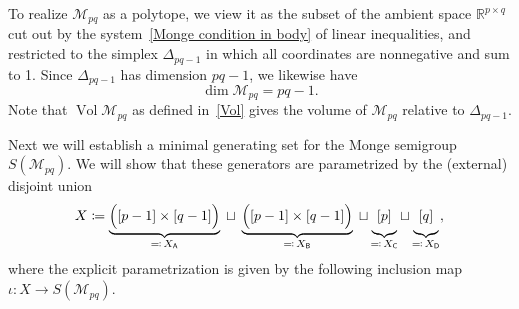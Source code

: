 \documentclass[noamsfonts,10pt]{amsart}
\newcommand{\R}{\mathbb{R}}
\newcommand{\M}{\mathcal{M}}
\DeclareMathOperator{\Vol}{Vol}
\newcommand{\sA}{\mathsf{A}}
\newcommand{\sB}{\mathsf{B}}
\newcommand{\sC}{\mathsf{C}}
\newcommand{\sD}{\mathsf{D}}
\newcommand{\1}{\mathbf{1}}
\theoremstyle{plain}
\theoremstyle{definition}
\numberwithin{equation}{section}
\begin{document}
To realize $\M_{pq}$ as a polytope, we view it as the subset of the ambient space $\R^{p \times q}$ cut out by the system~\eqref{Monge condition in body} of linear inequalities, and restricted to the simplex $\Delta_{pq-1}$ in which all coordinates are nonnegative and sum to 1.
Since $\Delta_{pq-1}$ has dimension $pq-1$, we likewise have
\begin{equation}
    \label{dim Mpq}
    \dim \M_{pq} = pq - 1.
\end{equation}
Note that $\Vol \M_{pq}$ as defined in~\eqref{Vol} gives the volume of $\M_{pq}$ relative to $\Delta_{pq-1}$.

Next we will establish a minimal generating set for the Monge semigroup $S(\M_{pq})$.
We will show that these generators are parametrized by the (external) disjoint union
\begin{equation}
        \label{X}
        X \coloneqq
        \underbrace{\Big( [p-1] \times [q-1] \Big)}_{\eqcolon \, X_{\sA}} \; \sqcup \; \underbrace{\Big( [p-1] \times [q-1] \Big)}_{\eqcolon \, X_{\sB}} \; \sqcup \underbrace{\vphantom{\Big(}[p]}_{\eqcolon \,  X_{\sC}} \sqcup \underbrace{\vphantom{\Big(}[q]}_{\eqcolon \, X_{\sD}},
    \end{equation}
where the explicit parametrization is given by the following inclusion map $\iota : X \longrightarrow S(\M_{pq})$.
\end{document}
